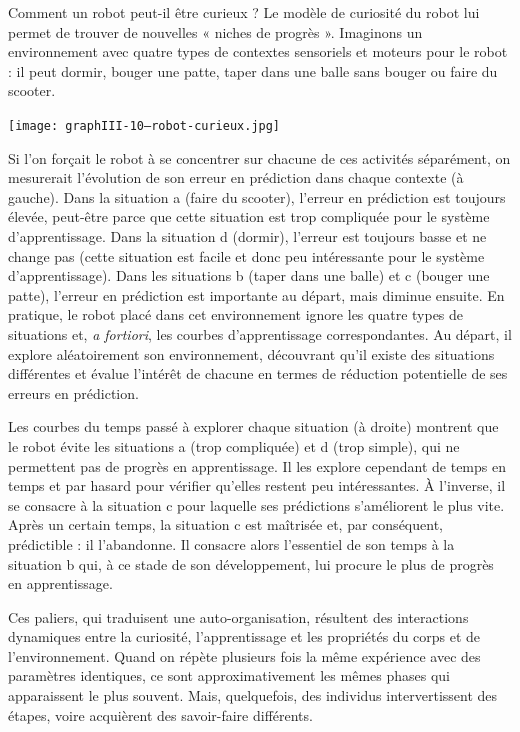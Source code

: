 \begin{fullinsert}[after skip=8pt]{Comment un robot peut-il être curieux ?}
\indent Le modèle de curiosité du robot lui permet de trouver de nouvelles « niches de progrès ». Imaginons un environnement avec quatre types de contextes sensoriels et moteurs pour le robot : il peut dormir, bouger une patte, taper dans une balle sans bouger ou faire du scooter.

\vspace{4pt}
\begin{center}
\texttt{[image: graphIII-10--robot-curieux.jpg]}
\end{center}
\vspace{-4pt}

Si l’on forçait le robot à se concentrer sur chacune de ces activités séparément, on mesurerait l’évolution de son erreur en prédiction dans chaque contexte (à gauche). Dans la situation a (faire du scooter), l’erreur en prédiction est toujours élevée, peut-être parce que cette situation est trop compliquée pour le système d’apprentissage. Dans la situation d (dormir), l’erreur est toujours basse et ne change pas (cette situation est facile et donc peu intéressante pour le système d’apprentissage). Dans les situations b (taper dans une balle) et c (bouger une patte), l’erreur en prédiction est importante au départ, mais diminue ensuite. En pratique, le robot placé dans cet environnement ignore les quatre types de situations et, \textit{a fortiori}, les courbes d’apprentissage correspondantes. Au départ, il explore aléatoirement son environnement, découvrant qu’il existe des situations différentes et évalue l’intérêt de chacune en termes de réduction potentielle de ses erreurs en prédiction.

Les courbes du temps passé à explorer chaque situation (à droite) montrent que le robot évite les situations a (trop compliquée) et d (trop simple), qui ne permettent pas de progrès en apprentissage. Il les explore cependant de temps en temps et par hasard pour vérifier qu’elles restent peu intéressantes. À l’inverse, il se consacre à la situation c pour laquelle ses prédictions s’améliorent le plus vite. Après un certain temps, la situation c est maîtrisée et, par conséquent, prédictible : il l’abandonne. Il consacre alors l’essentiel de son temps à la situation b qui, à ce stade de son développement, lui procure le plus de progrès en apprentissage.
\end{fullinsert}

Ces paliers, qui traduisent une auto-organisation, résultent des interactions dynamiques entre la curiosité, l’apprentissage et les propriétés du corps et de l’environnement. Quand on répète plusieurs fois la même expérience avec des paramètres identiques, ce sont approximativement les mêmes phases qui apparaissent le plus souvent. Mais, quelquefois, des individus intervertissent des étapes, voire acquièrent des savoir-faire différents.


